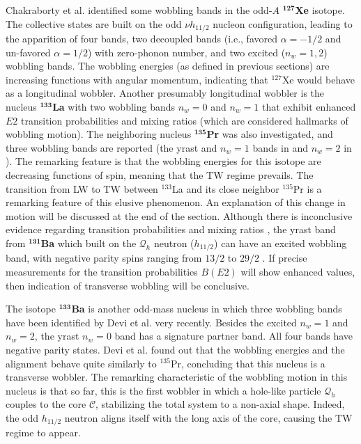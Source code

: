 Chakraborty et al. \cite{chakraborty2020multiphonon} identified some wobbling bands in the odd-$A$ $^\mathbf{127}$\textbf{Xe} isotope. The collective states are built on the odd $\nu h_{11/2}$ nucleon configuration, leading to the apparition of four bands, two decoupled bands (i.e., favored $\alpha=-1/2$ and un-favored $\alpha=1/2$) with zero-phonon number, and two excited ($n_w=1,2$) wobbling bands. The wobbling energies (as defined in previous sections) are increasing functions with angular momentum, indicating that $^{127}$Xe would behave as a longitudinal wobbler. Another presumably longitudinal wobbler is the nucleus $^\mathbf{133}$\textbf{La} with two wobbling bands $n_w=0$ and $n_w=1$ \cite{biswas2019longitudinal} that exhibit enhanced $E2$ transition probabilities and mixing ratios (which are considered hallmarks of wobbling motion). The neighboring nucleus $^\mathbf{135}$\textbf{Pr} was also investigated, and three wobbling bands are reported (the yrast and $n_w=1$ bands in \cite{matta2017transverse} and $n_w=2$ in \cite{sensharma2019two}). The remarking feature is that the wobbling energies for this isotope are decreasing functions of spin, meaning that the TW regime prevails. The transition from LW to TW between $^{133}$La and its close neighbor $^{135}$Pr is a remarking feature of this elusive phenomenon. An explanation of this change in motion will be discussed at the end of the section. Although there is inconclusive evidence regarding transition probabilities and mixing ratios \cite{ma1990competing,kaur2014high}, the yrast band from $^\mathbf{131}$\textbf{Ba} which built on the $\mathcal{Q}_h$ neutron ($h_{11/2}$) can have an excited wobbling band, with negative parity spins ranging from $13/2$ to $29/2$ \cite{petrache_2018}. If precise measurements for the transition probabilities $B(E2)$ will show enhanced values, then indication of transverse wobbling will be conclusive.

The isotope $^\mathbf{133}$\textbf{Ba} is another odd-mass nucleus in which three wobbling bands have been identified by Devi et al. \cite{devi2021observation} very recently. Besides the excited $n_w=1$ and $n_w=2$, the yrast $n_w=0$ band has a signature partner band. All four bands have negative parity states. Devi et al. found out that the wobbling energies and the alignment behave quite similarly to $^{135}$Pr, concluding that this nucleus is a transverse wobbler. The remarking characteristic of the wobbling motion in this nucleus is that so far, this is the first wobbler in which a hole-like particle $\mathcal{Q}_h$ couples to the core $\mathscr{C}$, stabilizing the total system to a non-axial shape. Indeed, the odd $h_{11/2}$ neutron aligns itself with the long axis of the core, causing the TW regime to appear.

